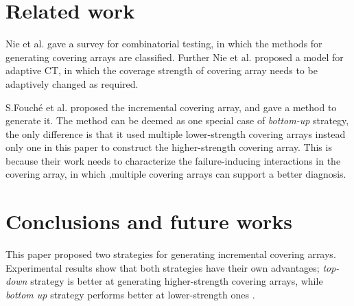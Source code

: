 \documentclass[conference]{IEEEtran}
\theoremstyle{definition}
\begin{document}

\section{Related work}
Nie et al. \cite{nie2011survey} gave a survey for combinatorial testing, in which the methods for generating covering
arrays are classified. Further Nie et al.\cite{nie2013adaptive} proposed a model for adaptive CT, in which the coverage strength of covering array needs to be adaptively changed as required.

S.Fouch{\'e}  et al. \cite{fouche2009incremental} proposed the incremental covering array, and gave a method to generate it. The method can be deemed as one special case of \emph{bottom-up} strategy, the only difference is that it used multiple lower-strength covering arrays instead only one in this paper to construct the higher-strength covering array. This is because their work needs to characterize the failure-inducing interactions in the covering array, in which ,multiple covering arrays can support a better diagnosis.
%


\section{Conclusions and future works}
This paper proposed two strategies for generating incremental covering arrays. Experimental results show that both strategies have their own advantages; \emph{top-down} strategy is better at generating higher-strength covering arrays, while \emph{bottom up} strategy performs better at lower-strength ones .
\end{document}

